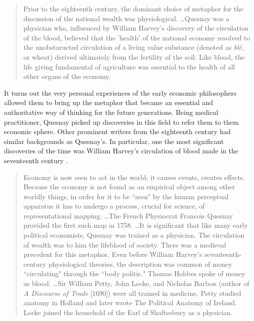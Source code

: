\begin{quote}
Prior to the eighteenth century, the dominant choice of metaphor for the discussion of the national wealth was physiological. \dots Quesnay was a physician who, influenced by William Harvey's discovery of the circulation of the blood, believed that the 'health' of the national economy resolved to the unobstaructed circulation of a living value substance (denoted as \textit{bl{\'e}}, or wheat) derived ultimately from the fertility of the soil. Like blood, the life giving fundamental of agriculture was essential to the health of all other organs of the economy. \citep[p.~90, emphasis original]{walker2020}
\end{quote}

It turns out the very personal experiences of the early economic philosophers allowed them to bring up the metaphor that became an essential and authoritative way of thinking for the future generations. Being medical practitioner, Quesnay picked up discoveries in this field to refer them to them economic sphere. Other prominent writers from the eighteenth century had similar backgrounds as Quesnay's. In particular, one the most significant discoveries of the time was William Harvey's circulation of blood made in the seventeenth century \citep{weston2013}.

\begin{quote}
Economy is now seen to act in the world; it causes events, creates effects. Because the economy is not found as an empirical object among other worldly things, in order for it to be ``seen" by the human perceptual apparatus it has to undergo a process, crucial for science, of representational mapping. \dots  The French Physiocrat Francois Quesnay provided the first such map in 1758. \dots  It is significant that like many early political economists, Quesnay was trained as a physician. The circulation of wealth was to him the lifeblood of society. There was a medieval precedent for this metaphor. Even before William Harvey's seventeenth-century physiological theories, the description was common of money ``circulating" through the ``body politic." Thomas Hobbes spoke of money as blood. \dots Sir William Petty, John Locke, and Nicholas Barbon (author of \textit{A Discourse of Trade} [1690]) were all trained in medicine. Petty studied anatomy in Holland and later wrote The Political Anatomy of Ireland. Locke joined the household of the Earl of Shaftesbury as a physician. \citep[p.~440]{buck-morss1995}
\end{quote}

